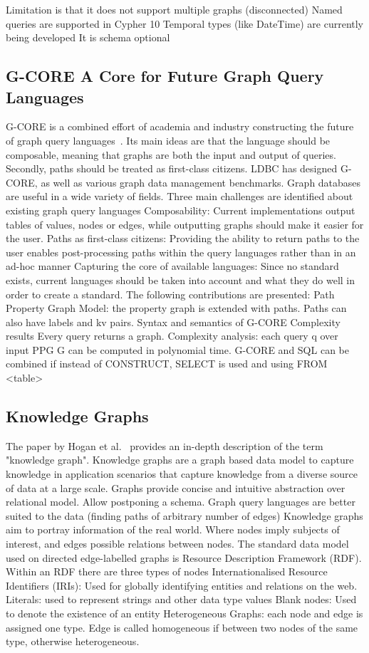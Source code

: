 Limitation is that it does not support multiple graphs (disconnected) 
Named queries are supported in Cypher 10
Temporal types (like DateTime) are currently being developed
It is schema optional


\subsection{G-CORE A Core for Future Graph Query Languages}
G-CORE is a combined effort of academia and industry constructing the future of graph query languages~\cite{ctx13027080550005131}. Its main ideas are that the language should be composable, meaning that graphs are both the input and output of queries. Secondly, paths should be treated as first-class citizens. 
LDBC has designed G-CORE, as well as various graph data management benchmarks. 
Graph databases are useful in a wide variety of fields. 
Three main challenges are identified about existing graph query languages
Composability: Current implementations output tables of values, nodes or edges, while outputting graphs should make it easier for the user. 
Paths as first-class citizens: Providing the ability to return paths to the user enables post-processing paths within the query languages rather than in an ad-hoc manner
Capturing the core of available languages: Since no standard exists, current languages should be taken into account and what they do well in order to create a standard.
The following contributions are presented:
Path Property Graph Model: the property graph is extended with paths. Paths can also have labels and kv pairs. 
Syntax and semantics of G-CORE
Complexity results
Every query returns a graph. 
Complexity analysis: each query q over input PPG G can be computed in polynomial time. 
G-CORE and SQL can be combined if instead of CONSTRUCT, SELECT is used and using FROM <table>

\subsection{Knowledge Graphs}
The paper by Hogan et al.~\cite{10.1145/3447772} provides an in-depth description of the term "knowledge graph". 
Knowledge graphs are a graph based data model to capture knowledge in application scenarios that capture knowledge from a diverse source of data at a large scale. Graphs provide concise and intuitive abstraction over relational model. Allow postponing a schema. Graph query languages are better suited to the data (finding paths of arbitrary number of edges)
Knowledge graphs aim to portray information of the real world. Where nodes imply subjects of interest, and edges possible relations between nodes. 
The standard data model used on directed edge-labelled graphs is Resource Description Framework (RDF). Within an RDF there are three types of nodes
Internationalised Resource Identifiers (IRIs): Used for globally identifying entities and relations on the web. 
Literals: used to represent strings and other data type values 
Blank nodes: Used to denote the existence of an entity
Heterogeneous Graphs: each node and edge is assigned one type. 
Edge is called homogeneous if between two nodes of the same type, otherwise heterogeneous.

